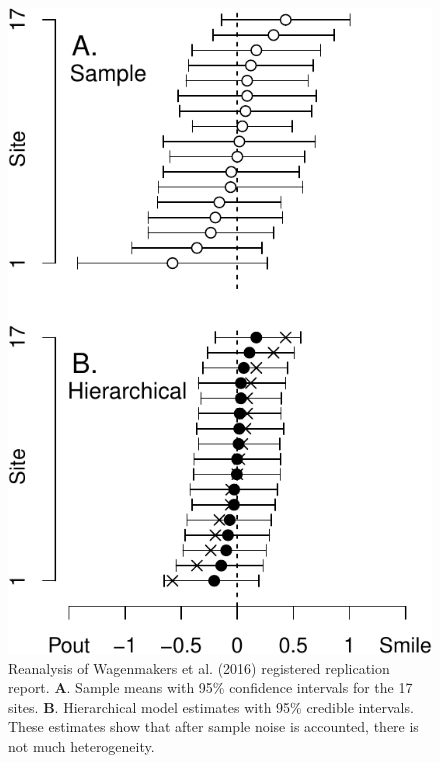 \documentclass[english,man]{apa6}
\theoremstyle{definition}
\theoremstyle{definition}
\theoremstyle{remark}
\begin{document}
\begin{figure}[htbp]
\centering
\includegraphics{p_files/figure-latex/wagEst-1.pdf}
\caption{\label{fig:wagEst}Reanalysis of Wagenmakers et al. (2016)
registered replication report. \textbf{A}. Sample means with 95\%
confidence intervals for the 17 sites. \textbf{B}. Hierarchical model
estimates with 95\% credible intervals. These estimates show that after
sample noise is accounted, there is not much heterogeneity.}
\end{figure}
\end{document}
